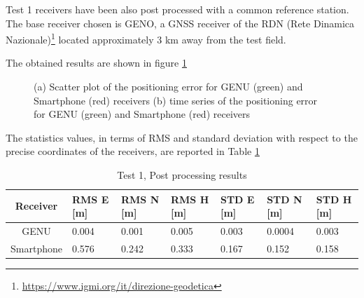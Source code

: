 Test 1 receivers have been also post processed with a common reference station. The base receiver chosen is GENO, a GNSS receiver of the RDN (Rete Dinamica Nazionale)\footnote{\url{https://www.igmi.org/it/direzione-geodetica}} located approximately 3 km away from the test field.

The obtained results are shown in figure \ref{FIG:test1_pp}

\begin{figure}[H] 
	\centering
    \caption{(a) Scatter plot of the positioning error for GENU (green) and Smartphone (red) receivers  (b) time series of the positioning error for GENU (green) and Smartphone (red) receivers}
	\label{FIG:test1_pp} 
\end{figure}

The statistics values, in terms of RMS and standard deviation with respect to the precise coordinates of the receivers, are reported in Table \ref{tab:test1_pp}

\begin{table}[H]
	\centering
		\begin{tabular}{|c|p{1.5cm}|p{1.5cm}|p{1.5cm}|p{1.5cm}|p{1.5cm}|p{1.5cm}|}
	\hline
	\textbf{Receiver} & \textbf{RMS E [m]} & \textbf{RMS N [m]} &
	\textbf{RMS H [m]} &\textbf{STD E [m]}&\textbf{STD N [m]}&\textbf{STD H [m]}\\
	\hline
	GENU & 0.004 & 0.001 & 0.005&0.003&0.0004&0.003\\  
    \hline
	Smartphone & 0.576 & 0.242& 0.333&0.167&0.152&0.158\\ \hline
	\end{tabular} 
	\caption{Test 1, Post processing results}
	\label{tab:test1_pp}
\end{table}

